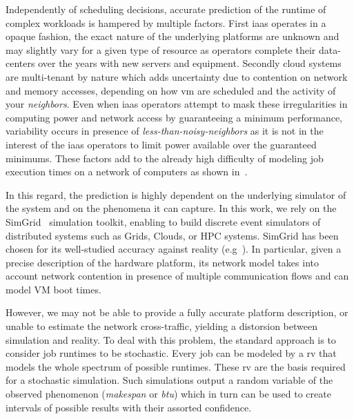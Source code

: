 \documentclass[10pt,conference,compsocconf]{IEEEtran}
\begin{document}
Independently of  scheduling decisions,  accurate prediction  of the  runtime of
complex workloads is hampered by  multiple factors.  First \ac{iaas} operates in
a opaque fashion,  the exact nature of the underlying  platforms are unknown and
may  slightly vary  for a  given type  of resource  as operators  complete their
data-centers  over the  years with  new servers  and equipment.   Secondly cloud
systems are multi-tenant  by nature which adds uncertainty due  to contention on
network and  memory accesses,  depending on  how \ac{vm}  are scheduled  and the
activity of  your \emph{neighbors}.   Even when  \ac{iaas} operators  attempt to
mask these irregularities in computing  power and network access by guaranteeing
a    minimum     performance,    variability     occurs    in     presence    of
\emph{less-than-noisy-neighbors} as it  is not in the interest  of the \ac{iaas}
operators to limit power available  over the guaranteed minimums.  These factors
add to the already high difficulty of  modeling job execution times on a network
of computers as shown in~\cite{Lastovetsky05}.

In this regard,  the prediction is highly dependent on  the underlying simulator
of the system and on the phenomena it  can capture. In this work, we rely on the
SimGrid~\cite{simgrid}  simulation toolkit,  enabling  to  build discrete  event
simulators of distributed systems such as Grids, Clouds, or HPC systems. SimGrid
has   been    chosen   for    its   well-studied   accuracy    against   reality
(e.g~\cite{StanisicTLVM15,VelhoSCL13}).    In   particular,  given   a   precise
description  of the  hardware platform,  its  network model  takes into  account
network contention in presence of multiple  communication flows and can model VM
boot times.

However, we may not be able to provide a fully accurate platform description, or
unable  to estimate  the network  cross-traffic, yielding  a distorsion  between
simulation and reality.  To deal with this problem, the  standard approach is to
consider job runtimes to  be stochastic.  Every job can be  modeled by a \ac{rv}
that models the whole spectrum of possible runtimes. These \ac{rv} are the basis
required for a stochastic simulation.  Such simulations output a random variable
of the  observed phenomenon (\emph{makespan}  or \emph{\ac{btu}}) which  in turn
can  be  used to  create  intervals  of  possible  results with  their  assorted
confidence.
\end{document}
